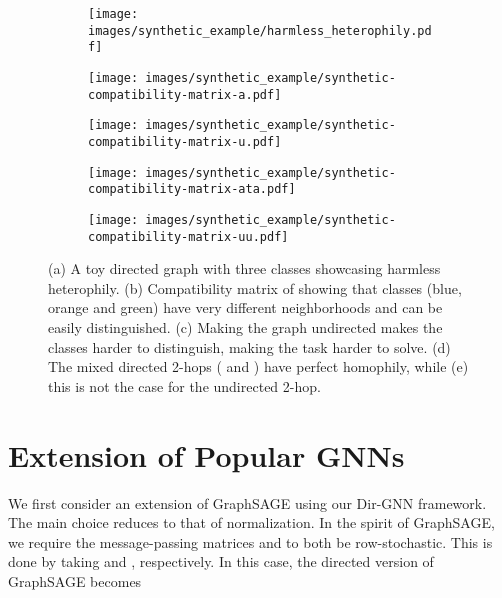 \documentclass{article}
\newcommand\oursacro{Dir-GNN}
\theoremstyle{plain}
\theoremstyle{definition}
\theoremstyle{remark}
\begin{document}
\begin{figure}[t!]
\vspace{-4mm}
\centering
\begin{subfigure}[b]{0.19\textwidth}
     \centering
     \texttt{[image: images/synthetic\_example/harmless\_heterophily.pdf]}
     \caption{}
\end{subfigure}
\hfill
\begin{subfigure}[b]{0.19\textwidth}
     \centering
     \texttt{[image: images/synthetic\_example/synthetic-compatibility-matrix-a.pdf]}
     \caption{}
\end{subfigure}
\hfill
\begin{subfigure}[b]{0.19\textwidth}
     \centering
     \texttt{[image: images/synthetic\_example/synthetic-compatibility-matrix-u.pdf]}
     \caption{}
\end{subfigure}
\hfill
\begin{subfigure}[b]{0.19\textwidth}
     \centering
     \texttt{[image: images/synthetic\_example/synthetic-compatibility-matrix-ata.pdf]}
     \caption{}
\end{subfigure}
\hfill
\begin{subfigure}[b]{0.19\textwidth}
     \centering
     \texttt{[image: images/synthetic\_example/synthetic-compatibility-matrix-uu.pdf]}
     \caption{}
\end{subfigure}

\caption{(a) A toy directed graph with three classes showcasing harmless heterophily.
(b) Compatibility matrix of  showing that classes (blue, orange and green) have very different neighborhoods and can be easily distinguished. (c) Making the graph undirected makes the classes harder to distinguish, making the task harder to solve. 
(d) The mixed directed 2-hops ( and ) have perfect homophily, while (e) this is not the case for the undirected 2-hop.}
\label{fig:synthetic_example}
\vspace{-5mm}
\end{figure}

\section{Extension of Popular GNNs} \label{app:extensions}
We first consider an extension of GraphSAGE \cite{hamilton2017inductive} using our \oursacro{} framework. The main choice reduces to that of normalization. In the spirit of GraphSAGE, we require the message-passing matrices  and  to both be row-stochastic. This is done by taking  and , respectively. In this case, the directed version of GraphSAGE becomes
\end{document}
